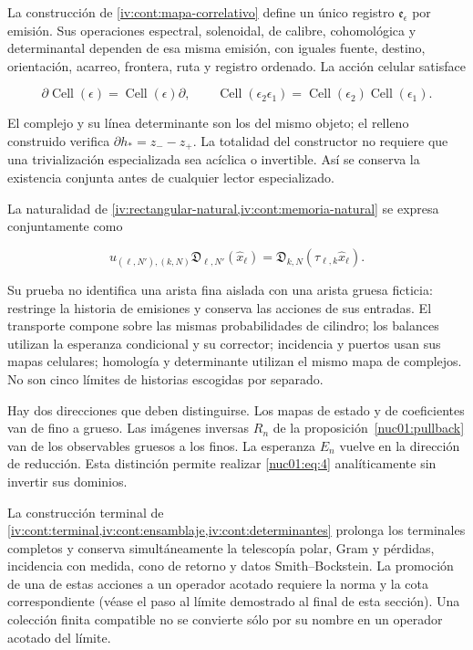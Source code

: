 La construcción de \cref{iv:cont:mapa-correlativo} define un único registro \(\mathfrak e_\epsilon\) por emisión. Sus operaciones espectral, solenoidal, de calibre, cohomológica y determinantal dependen de esa misma emisión, con iguales fuente, destino, orientación, acarreo, frontera, ruta y registro ordenado. La acción celular satisface

\[
\partial\operatorname{Cell}(\epsilon)=\operatorname{Cell}(\epsilon)\partial,
\qquad
\operatorname{Cell}(\epsilon_2\epsilon_1)
=\operatorname{Cell}(\epsilon_2)\operatorname{Cell}(\epsilon_1).
\]

El complejo y su línea determinante son los del mismo objeto; el relleno construido verifica \(\partial h_*=z_--z_+\). La totalidad del constructor no requiere que una trivialización especializada sea acíclica o invertible. Así se conserva la existencia conjunta antes de cualquier lector especializado.

La naturalidad de \cref{iv:rectangular-natural,iv:cont:memoria-natural} se expresa conjuntamente como

\begin{equation}
u_{(\ell,N'),(k,N)}\mathfrak D_{\ell,N'}(\widehat x_\ell)
=\mathfrak D_{k,N}(\tau_{\ell,k}\widehat x_\ell).
\label{nuc01:eq:4}
\end{equation}

Su prueba no identifica una arista fina aislada con una arista gruesa ficticia: restringe la historia de emisiones y conserva las acciones de sus entradas. El transporte compone sobre las mismas probabilidades de cilindro; los balances utilizan la esperanza condicional y su corrector; incidencia y puertos usan sus mapas celulares; homología y determinante utilizan el mismo mapa de complejos. No son cinco límites de historias escogidas por separado.

Hay dos direcciones que deben distinguirse. Los mapas de estado y de coeficientes van de fino a grueso. Las imágenes inversas \(R_n\) de la proposición~\ref{nuc01:pullback} van de los observables gruesos a los finos. La esperanza \(E_n\) vuelve en la dirección de reducción. Esta distinción permite realizar \eqref{nuc01:eq:4} analíticamente sin invertir sus dominios.

La construcción terminal de \cref{iv:cont:terminal,iv:cont:ensamblaje,iv:cont:determinantes} prolonga los terminales completos y conserva simultáneamente la telescopía polar, Gram y pérdidas, incidencia con medida, cono de retorno y datos Smith–Bockstein. La promoción de una de estas acciones a un operador acotado requiere la norma y la cota correspondiente (véase el paso al límite demostrado al final de esta sección). Una colección finita compatible no se convierte sólo por su nombre en un operador acotado del límite.


